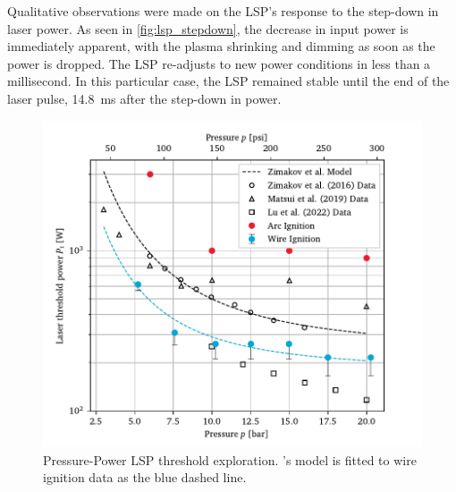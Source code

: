             Qualitative observations were made on the LSP's response to the step-down in laser power. As seen in \autoref{fig:lsp_stepdown}, the decrease in input power is immediately apparent, with the plasma shrinking and dimming as soon as the power is dropped. The LSP re-adjusts to new power conditions in less than a millisecond. In this particular case, the LSP remained stable until the end of the laser pulse, \qty{14.8}{ms} after the step-down in power.


            \begin{figure}[h]
                \centering
                \includegraphics[]{assets/5 results/powerthreshold}
                \caption[Pressure-Power LSP threshold exploration]{Pressure-Power LSP threshold exploration. \textcite{zimakovInteractionNearIRLaser2016}'s model is fitted to wire ignition data as the blue dashed line.}
                \label{fig:powerthreshold}
            \end{figure}

